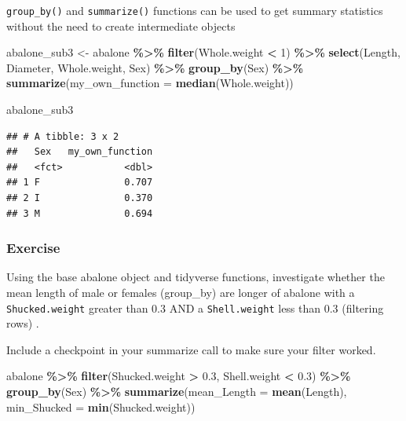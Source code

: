 \documentclass[
]{book}
\newenvironment{Shaded}{\begin{snugshade}}{\end{snugshade}}
\newcommand{\AttributeTok}[1]{\textcolor[rgb]{0.13,0.29,0.53}{#1}}
\newcommand{\DecValTok}[1]{\textcolor[rgb]{0.00,0.00,0.81}{#1}}
\newcommand{\FloatTok}[1]{\textcolor[rgb]{0.00,0.00,0.81}{#1}}
\newcommand{\FunctionTok}[1]{\textcolor[rgb]{0.13,0.29,0.53}{\textbf{#1}}}
\newcommand{\NormalTok}[1]{#1}
\newcommand{\OtherTok}[1]{\textcolor[rgb]{0.56,0.35,0.01}{#1}}
\newcommand{\SpecialCharTok}[1]{\textcolor[rgb]{0.81,0.36,0.00}{\textbf{#1}}}
\begin{document}
\texttt{group\_by()} and \texttt{summarize()} functions can be used to get summary statistics without the need to create intermediate objects

\begin{Shaded}
\begin{Highlighting}[]
\NormalTok{abalone\_sub3 }\OtherTok{\textless{}{-}}\NormalTok{ abalone }\SpecialCharTok{\%\textgreater{}\%} 
  \FunctionTok{filter}\NormalTok{(Whole.weight }\SpecialCharTok{\textless{}} \DecValTok{1}\NormalTok{) }\SpecialCharTok{\%\textgreater{}\%} 
  \FunctionTok{select}\NormalTok{(Length, Diameter, Whole.weight, Sex) }\SpecialCharTok{\%\textgreater{}\%} 
  \FunctionTok{group\_by}\NormalTok{(Sex) }\SpecialCharTok{\%\textgreater{}\%} 
  \FunctionTok{summarize}\NormalTok{(}\AttributeTok{my\_own\_function =} \FunctionTok{median}\NormalTok{(Whole.weight))}

\NormalTok{abalone\_sub3}
\end{Highlighting}
\end{Shaded}

\begin{verbatim}
## # A tibble: 3 x 2
##   Sex   my_own_function
##   <fct>           <dbl>
## 1 F               0.707
## 2 I               0.370
## 3 M               0.694
\end{verbatim}

\subsubsection{Exercise}\label{exercise-1}

Using the base abalone object and tidyverse functions, investigate whether the mean length of male or females (group\_by) are longer of abalone with a \texttt{Shucked.weight} greater than 0.3 AND a \texttt{Shell.weight} less than 0.3 (filtering rows) .

Include a checkpoint in your summarize call to make sure your filter worked.

\begin{Shaded}
\begin{Highlighting}[]
\NormalTok{abalone }\SpecialCharTok{\%\textgreater{}\%} 
  \FunctionTok{filter}\NormalTok{(Shucked.weight }\SpecialCharTok{\textgreater{}} \FloatTok{0.3}\NormalTok{, Shell.weight }\SpecialCharTok{\textless{}} \FloatTok{0.3}\NormalTok{) }\SpecialCharTok{\%\textgreater{}\%} 
  \FunctionTok{group\_by}\NormalTok{(Sex) }\SpecialCharTok{\%\textgreater{}\%} 
  \FunctionTok{summarize}\NormalTok{(}\AttributeTok{mean\_Length =} \FunctionTok{mean}\NormalTok{(Length), }
            \AttributeTok{min\_Shucked =} \FunctionTok{min}\NormalTok{(Shucked.weight))}
\end{Highlighting}
\end{Shaded}
\end{document}
